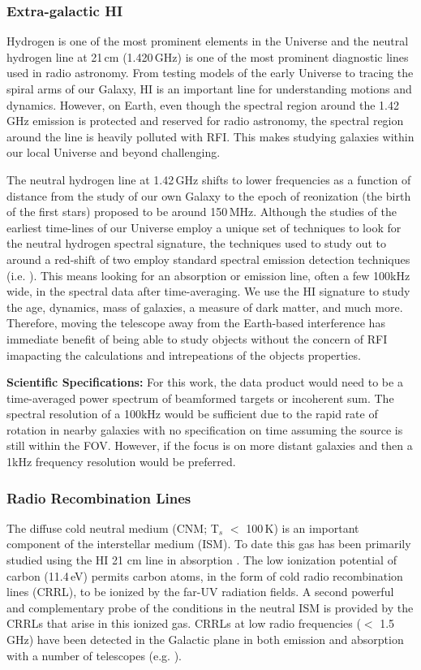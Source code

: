 \subsubsection{Extra-galactic HI}
Hydrogen is one of the most prominent elements in the Universe and the neutral hydrogen line at 21\,cm (1.420\,GHz) is one of the most prominent diagnostic lines used in radio astronomy. From testing models of the early Universe to tracing the spiral arms of our Galaxy, H{\sc I} is an important line for understanding motions and dynamics. However, on Earth, even though the spectral region around the 1.42\,GHz emission is protected and reserved for radio astronomy, the spectral region around the line is heavily polluted with RFI. This makes studying galaxies within our local Universe and beyond challenging. 

The neutral hydrogen line at 1.42\,GHz shifts to lower frequencies as a function of distance from the study of our own Galaxy to the epoch of reonization (the birth of the first stars) proposed to be around 150\,MHz. Although the studies of the earliest time-lines of our Universe employ a unique set of techniques to look for the neutral hydrogen spectral signature, the techniques used to study out to around a red-shift of two employ standard spectral emission detection techniques (i.e. \citealt{WALLABY,FLASH}). This means looking for an absorption or emission line, often a few 100kHz wide, in the spectral data after time-averaging. We use the H{\sc I} signature to study the age, dynamics, mass of galaxies, a measure of dark matter, and much more. Therefore, moving the telescope away from the Earth-based interference has immediate benefit of being able to study objects without the concern of RFI imapacting the calculations and intrepeations of the objects properties.

\textbf{Scientific Specifications:} For this work, the data product would need to be a time-averaged power spectrum of beamformed targets or incoherent sum. The spectral resolution of a 100kHz would be sufficient due to the rapid rate of rotation in nearby galaxies with no specification on time assuming the source is still within the FOV. However, if the focus is on more distant galaxies and then a 1kHz frequency resolution would be preferred. 

\subsubsection{Radio Recombination Lines}
The diffuse cold neutral medium (CNM; T$_{s}$ $<$ 100\,K) is an important component of the interstellar medium (ISM). To date this gas has been primarily studied using the HI 21 cm line in absorption \citep{Dickey_1990}. The low ionization potential of carbon (11.4\,eV) permits carbon atoms, in the form of cold radio recombination lines (CRRL), to be ionized by the far-UV radiation fields. A second powerful and complementary probe of the conditions in the neutral ISM is provided by the CRRLs that arise in this ionized gas. CRRLs at low radio frequencies ($<$ 1.5 GHz) have been detected in the Galactic plane in both emission and absorption with a number of telescopes (e.g. \citealt{Kantharia_2001,Salas_2019,GDIGS}). 

